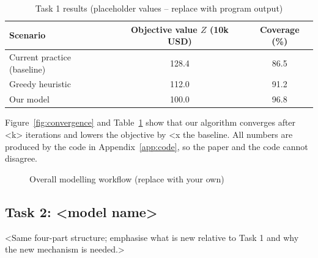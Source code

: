 \documentclass[12pt]{article}
\begin{document}
\begin{table}[htbp]
  \centering
  \caption{Task 1 results (placeholder values -- replace with program output)}
  \label{tab:task1}
  \begin{tabular}{lcc}
    \toprule
    Scenario & Objective value $Z$ (10k USD) & Coverage (\%) \\
    \midrule
    Current practice (baseline) & 128.4 & 86.5 \\
    Greedy heuristic            & 112.0 & 91.2 \\
    Our model                   & 100.0 & 96.8 \\
    \bottomrule
  \end{tabular}
\end{table}

Figure~\ref{fig:convergence} and Table~\ref{tab:task1} show that our algorithm
converges after <k> iterations and lowers the objective by <x%
the baseline. All numbers are produced by the code in Appendix~\ref{app:code},
so the paper and the code cannot disagree.

\begin{figure}[htbp]
  \centering
  \caption{Overall modelling workflow (replace with your own)}
  \label{fig:workflow}
\end{figure}

\subsection{Task 2: <model name>}
<Same four-part structure; emphasise what is new relative to Task 1 and why
the new mechanism is needed.>
\end{document}
